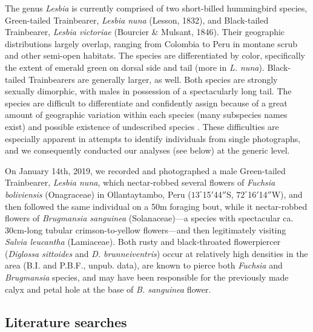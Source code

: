 \documentclass[fleqn,10pt,lineno]{wlpeerj}
\begin{document}
The genus \textit{Lesbia} is currently comprised of two short-billed hummingbird species, Green-tailed Trainbearer, \textit{Lesbia nuna} (Lesson, 1832), and Black-tailed Trainbearer, \textit{Lesbia victoriae} (Bourcier \& Mulsant, 1846). 
Their geographic distributions largely overlap, ranging from Colombia to Peru in montane scrub and other semi-open habitats. 
The species are differentiated by color, specifically the extent of emerald green on dorsal side and tail (more in \textit{L. nuna}). 
Black-tailed Trainbearers are generally larger, as well. 
Both species are strongly sexually dimorphic, with males in possession of a spectacularly long tail.
The species are difficult to differentiate and confidently assign because of a great amount of geographic variation within each species (many subspecies names exist) and possible existence of undescribed species \citep{weller2004,stiles2004}. %
These difficulties are especially apparent in attempts to identify individuals from single photographs, and we consequently conducted our analyses (see below) at the generic level.

On January 14th, 2019, we recorded and photographed a male Green-tailed Trainbearer, \textit{Lesbia nuna}, which nectar-robbed several flowers of \textit{Fuchsia boliviensis} (Onagraceae) in Ollantaytambo, Peru ($13^{\circ}$15$'$44$''$S, $72^{\circ}$16$'$14$''$W), and then followed the same individual on a 50m foraging bout, while it nectar-robbed flowers of \textit{Brugmansia sanguinea} (Solanaceae)---a species with spectacular ca. 30cm-long tubular crimson-to-yellow flowers---and then legitimately visiting \textit{Salvia leucantha} (Lamiaceae). Both rusty and black-throated flowerpiercer (\textit{Diglossa sittoides} and \textit{D. brunneiventris}) occur at relatively high densities in the area (B.I. and P.B.F., unpub. data), are known to pierce both \textit{Fuchsia} and \textit{Brugmansia} species, and may have been responsible for the previously made calyx and petal hole at the base of \textit{B. sanguinea} flower.

\subsection*{Literature searches}
\end{document}
